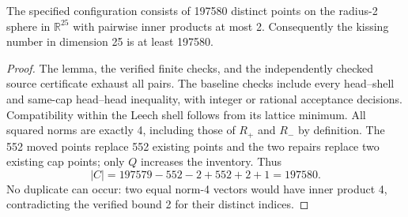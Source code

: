 \begin{theorem}\label{thm:d25}
The specified configuration consists of 197580 distinct points on
the radius-2 sphere in $\mathbb R^{25}$ with pairwise inner products at
most 2. Consequently the kissing number in dimension 25 is at least 197580.
\end{theorem}

\begin{proof}
The lemma, the verified finite checks, and the independently checked source
certificate exhaust all pairs. The baseline checks include every head--shell
and same-cap head--head inequality, with integer or rational acceptance
decisions. Compatibility within the Leech shell follows from its lattice
minimum.
All squared norms are exactly 4, including those of $R_+$ and $R_-$ by
definition. The 552 moved points replace 552 existing points and the two
repairs replace two existing cap points; only $Q$ increases the inventory.
Thus
\[
 |C|=197579-552-2+552+2+1=197580.
\]
No duplicate can occur: two equal norm-4 vectors would have inner product
4, contradicting the verified bound 2 for their distinct indices.
\end{proof}
